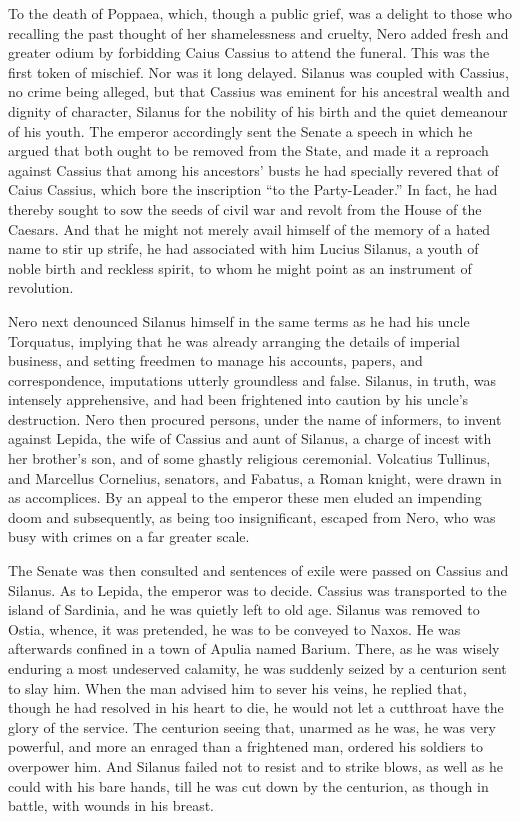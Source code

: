 To the death of Poppaea, which, though a public grief, was a delight to those who recalling the past thought of her shamelessness and cruelty, Nero added fresh and greater odium by forbidding Caius Cassius to attend the funeral. This was the first token of mischief. Nor was it long delayed. Silanus was coupled with Cassius, no crime being alleged, but that Cassius was eminent for his ancestral wealth and dignity of character, Silanus for the nobility of his birth and the quiet demeanour of his youth. The emperor accordingly sent the Senate a speech in which he argued that both ought to be removed from the State, and made it a reproach against Cassius that among his ancestors' busts he had specially revered that of Caius Cassius, which bore the inscription ``to the Party-Leader.'' In fact, he had thereby sought to sow the seeds of civil war and revolt from the House of the Caesars. And that he might not merely avail himself of the memory of a hated name to stir up strife, he had associated with him Lucius Silanus, a youth of noble birth and reckless spirit, to whom he might point as an instrument of revolution.


Nero next denounced Silanus himself in the same terms as he had his uncle Torquatus, implying that he was already arranging the details of imperial business, and setting freedmen to manage his accounts, papers, and correspondence, imputations utterly groundless and false. Silanus, in truth, was intensely apprehensive, and had been frightened into caution by his uncle's destruction. Nero then procured persons, under the name of informers, to invent against Lepida, the wife of Cassius and aunt of Silanus, a charge of incest with her brother's son, and of some ghastly religious ceremonial. Volcatius Tullinus, and Marcellus Cornelius, senators, and Fabatus, a Roman knight, were drawn in as accomplices. By an appeal to the emperor these men eluded an impending doom and subsequently, as being too insignificant, escaped from Nero, who was busy with crimes on a far greater scale.


The Senate was then consulted and sentences of exile were passed on Cassius and Silanus. As to Lepida, the emperor was to decide. Cassius was transported to the island of Sardinia, and he was quietly left to old age. Silanus was removed to Ostia, whence, it was pretended, he was to be conveyed to Naxos. He was afterwards confined in a town of Apulia named Barium. There, as he was wisely enduring a most undeserved calamity, he was suddenly seized by a centurion sent to slay him. When the man advised him to sever his veins, he replied that, though he had resolved in his heart to die, he would not let a cutthroat have the glory of the service. The centurion seeing that, unarmed as he was, he was very powerful, and more an enraged than a frightened man, ordered his soldiers to overpower him. And Silanus failed not to resist and to strike blows, as well as he could with his bare hands, till he was cut down by the centurion, as though in battle, with wounds in his breast.

